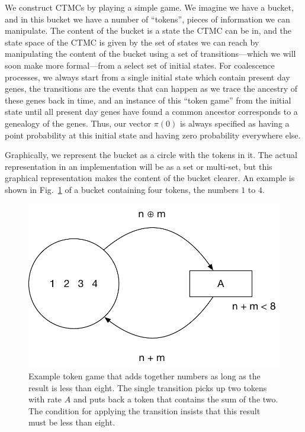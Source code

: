\documentclass[graybox]{svmult}
\begin{document}
We construct CTMCs by playing a simple game. We imagine we have a bucket, and in this bucket we have a number of ``tokens'', pieces of information we can manipulate. The content of the bucket is a state the CTMC can be in, and the state space of the CTMC is given by the set of states we can reach by manipulating the content of the bucket using a set of transitions---which we will soon make more formal---from a select set of initial states. For coalescence processes, we always start from a single initial state which contain present day genes, the transitions are the events that can happen as we trace the ancestry of these genes back in time, and an instance of this ``token game'' from the initial state until all present day genes have found a common ancestor corresponds to a genealogy of the genes. Thus, our vector $\pi(0)$ is always specified as having a point probability at this initial state and having zero probability everywhere else.

Graphically, we represent the bucket as a circle with the tokens in it. The actual representation in an implementation will be as a set or multi-set, but this graphical representation makes the content of the bucket clearer. An example is shown in Fig.~\ref{fig:example-CPN} of a bucket containing four tokens, the numbers $1$ to $4$.

\begin{figure}[h]
\sidecaption
\includegraphics[scale=.45]{figures/example-CPN}
\caption{Example token game that adds together numbers as long as the result is less than eight. The single transition picks up two tokens with rate $A$ and puts back a token that contains the sum of the two. The condition for applying the transition insists that this result must be less than eight.}
\label{fig:example-CPN}
\end{figure}
\end{document}
